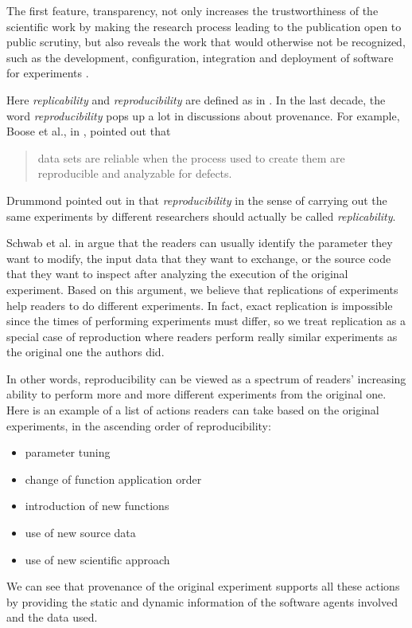 The first feature, transparency, not only increases the trustworthiness of the scientific work by 
making the research process leading to the publication open to public scrutiny, but also reveals the 
work that would otherwise not be recognized, such as the development, configuration, integration and 
deployment of software for experiments \cite{goble2014better}.

Here \emph{replicability} and \emph{reproducibility} are defined as in 
\cite{drummond2009replicability}. In the last decade, the word \emph{reproducibility} pops up a lot 
in discussions about provenance. For example, 
Boose et al., in \cite{boose2007ensuring}, pointed out that
\begin{quote}data sets are reliable when the process used to create them are reproducible and 
analyzable for defects.\end{quote}
Drummond pointed out in \cite{drummond2009replicability} that \emph{reproducibility} in the sense of 
carrying out the same experiments by different researchers should actually be called 
\emph{replicability}.

Schwab et al. in \cite{schwab2000making} argue that the readers can usually identify the parameter 
they want to modify, the input data that they want to exchange, or the source code that they want to 
inspect after analyzing the execution of the original experiment. Based on this argument, we believe 
that replications of experiments help readers to do different experiments. In fact, exact replication 
is impossible since the times of performing experiments must differ, so we treat replication as a 
special case of reproduction where readers perform really similar experiments as the original one the 
authors did.

In other words, reproducibility can be viewed as a spectrum of readers' increasing ability to perform 
more and more different experiments from the original one. Here is an example of a list of actions 
readers can take based on the original experiments, in the ascending order of reproducibility:
\begin{itemize}
\item parameter tuning
\item change of function application order
\item introduction of new functions
\item use of new source data
\item use of new scientific approach
\end{itemize}
We can see that provenance of the original experiment supports all these actions by providing the 
static and dynamic information of the software agents involved and the data used.


